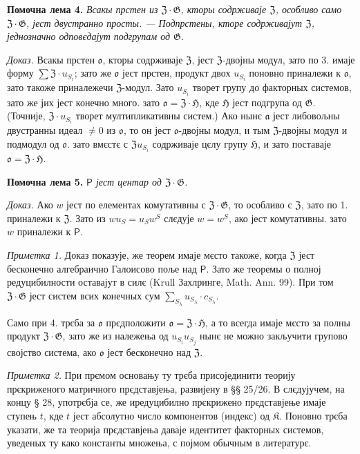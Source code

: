 \documentclass[11pt]{article}
\begin{document}
\noindent\textbf{Помочна лема 4.} \emph{Всакы прстен из \(\mathfrak Z\cdot\mathfrak G\), кторы содрживаје \(\mathfrak Z\), особливо само \(\mathfrak Z\cdot\mathfrak G\), јест двустранно просты. --- Подпрстены, кторе содрживајут \(\mathfrak Z\), једнозначно одповєдајут подгрупам од \(\mathfrak G\).}

\noindent\emph{Доказ.} Всакы прстен \(\mathfrak o\), кторы содрживаје \(\mathfrak Z\), јест \(\mathfrak Z\)-двојны модул, зато по 3. имаје форму \(\sum\mathfrak Z\cdot u_{S_i}\); зато же \(\mathfrak o\) јест прстен, продукт двох \(u_{S_i}\) поновно приналежи к \(\mathfrak o\), зато такоже приналежечи \(\mathfrak Z\)-модул. Зато \(u_{S_i}\) творет групу до факторных системов, зато же јих јест конечно много. зато \(\mathfrak o=\mathfrak Z\cdot\mathfrak H\), кде \(\mathfrak H\) јест подгрупа од \(\mathfrak G\). (Точније, \(\mathfrak Z\cdot u_{S_i}\) творет мултипликативны систем.) Ако нынє \(\mathfrak a\) јест либовољны двустранны идеал \(\neq0\) из \(\mathfrak o\), то он јест \(\mathfrak o\)-двојны модул, и тым \(\mathfrak Z\)-двојны модул и подмодул од \(\mathfrak o\). зато вмєстє с \(\mathfrak Zu_{S_i}\) содрживаје цєлу групу \(\mathfrak H\), и зато поставаје \(\mathfrak o=\mathfrak Z\cdot\mathfrak H\).

\noindent\textbf{Помочна лема 5.} \emph{\(\mathsf{P}\) јест центар од \(\mathfrak Z\cdot\mathfrak G\).}

\noindent\emph{Доказ.} Ако \(w\) јест по елементах комутативны с \(\mathfrak Z\cdot\mathfrak G\), то особливо с \(\mathfrak Z\), зато по 1. приналежи к \(\mathfrak Z\). Зато из \(wu_S=u_Sw^S\) слєдује \(w=w^S\), ако јест комутативны. зато \(w\) приналежи к \(\mathsf{P}\).

\noindent\emph{Примєтка 1.} Доказ показује, же теорем имаје мєсто такоже, когда \(\mathfrak Z\) јест бесконечно алгебраично Галоисово поље над \(\mathsf{P}\). Зато же теоремы о полној редуцибилности оставајут в силє (Krull Захлринге, Math. Ann. 99). При том \(\mathfrak Z\cdot\mathfrak G\) јест систем всих конечных сум \(\sum_{S_\lambda}u_{S_\lambda}\cdot c_{S_\lambda}\).

Само при 4. трєба за \(\mathfrak o\) прєдположити \(\mathfrak o=\mathfrak Z\cdot\mathfrak H\), а то всегда имаје мєсто за полны продукт \(\mathfrak Z\cdot\mathfrak G\), зато же из належења од \(u_{S_i}u_{S_j}\) нынє не можно закључити групово својство система, ако \(\mathfrak o\) јест бесконечно над \(\mathfrak Z\).

\noindent\emph{Примєтка 2.} При прємом основању ту трєба присојединити теорију прєкриженого матричного прєдставјења, развијену в §§ 25/26. В слєдујучем, на концу § 28, употрєбја се, же иредуцибилно прєкрижено прєдставјење имаје ступењ \(t\), кде \(t\) јест абсолутно число компонентов (индекс) од \(\mathfrak K\). Поновно трєба указати, же та теорија прєдставјења даваје идентитет факторных системов, уведеных ту како константы множења, с појмом обычным в литературє.
\end{document}
